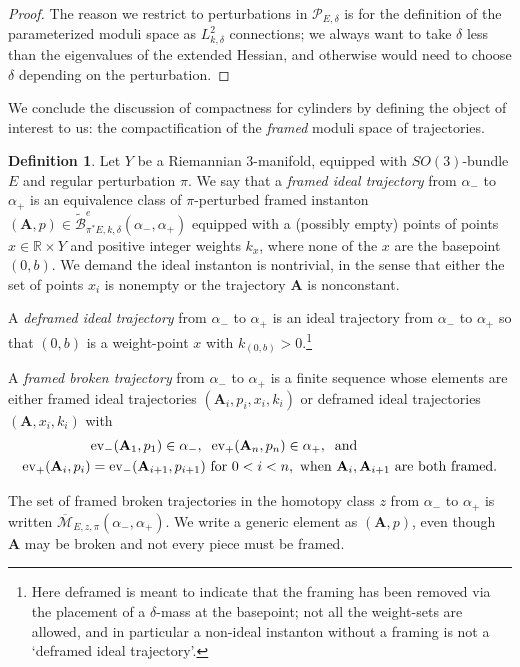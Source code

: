 \documentclass{memo-l}
\newcommand{\pE}{\pi^* \! E}
\theoremstyle{definition}
\newtheorem{definition}[theorem]{Definition}
\theoremstyle{remark}
\numberwithin{section}{chapter}
\numberwithin{equation}{chapter}
\begin{document}
\begin{proof}
The reason we restrict to perturbations in $\mathcal P_{E,\delta}$ is for the definition of the parameterized moduli space as $L^2_{k,\delta}$ connections; we always want to take $\delta$ less than the eigenvalues of the extended Hessian, and otherwise would need to choose $\delta$ depending on the perturbation.
\end{proof}

We conclude the discussion of compactness for cylinders by defining the object of interest to us: the compactification of the \emph{framed} moduli space of trajectories.

\begin{definition}Let $Y$ be a Riemannian 3-manifold, equipped with $SO(3)$-bundle $E$ and regular perturbation $\pi$. We say that a \emph{framed ideal trajectory} from $\alpha_-$ to $\alpha_+$ is an equivalence class of $\pi$-perturbed framed instanton $(\mathbf A,p) \in \widetilde{\mathcal B}^e_{\pE,k,\delta}(\alpha_-,\alpha_+)$ equipped with a (possibly empty) points of points $x \in \mathbb R \times Y$ and positive integer weights $k_x$, where none of the $x$ are the basepoint $(0,b)$. We demand the ideal instanton is nontrivial, in the sense that either the set of points $x_i$ is nonempty or the trajectory $\mathbf{A}$ is nonconstant.

A \emph{deframed ideal trajectory} from $\alpha_-$ to $\alpha_+$ is an ideal trajectory from $\alpha_-$ to $\alpha_+$ so that $(0,b)$ is a weight-point $x$ with $k_{(0,b)} > 0$.\footnote{Here deframed is meant to indicate that the framing has been removed via the placement of a $\delta$-mass at the basepoint; not all the weight-sets are allowed, and in particular a non-ideal instanton without a framing is not a `deframed ideal trajectory'.}

A \emph{framed broken trajectory} from $\alpha_-$ to $\alpha_+$ is a finite sequence whose elements are either framed ideal trajectories $(\mathbf{A}_i,p_i,x_i, k_i)$ or deframed ideal trajectories $(\mathbf{A},x_i,k_i)$ with
\begin{align*}&\textup{ev}_-(\mathbf{A}_1,p_1) \in \alpha_-, \; \; \textup{ev}_+ (\mathbf{A}_n,p_n) \in \alpha_+, \;\; \textup{and}\\
\textup{ev}_+ (\mathbf{A}_i,p_i) &= \textup{ev}_- (\mathbf{A}_{i+1},p_{i+1}) \textup{  for }0 < i < n,\textup{ when } \mathbf{A}_i, \mathbf{A}_{i+1} \textup{ are both framed}.\end{align*}

The set of framed broken trajectories in the homotopy class $z$ from $\alpha_-$ to $\alpha_+$ is written $\overline{\mathcal M}_{E,z,\pi}(\alpha_-, \alpha_+)$. We write a generic element as $(\mathbf{A},p)$, even though $\mathbf{A}$ may be broken and not every piece must be framed.
\end{definition}
\end{document}
